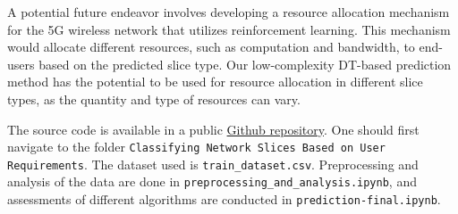 \documentclass[conference]{IEEEtran}
\begin{document}
A potential future endeavor involves developing a resource allocation mechanism for the 5G wireless network that utilizes reinforcement learning. This mechanism would allocate different resources, such as computation and bandwidth, to end-users based on the predicted slice type. Our low-complexity DT-based prediction method has the potential to be used for resource allocation in different slice types, as the quantity and type of resources can vary.

 
{}

\appendix
The source code is available in a public \href{https://github.com/sinaebrahimi/ml-7072cem}{Github repository}. One should first navigate to the folder \texttt{\footnotesize Classifying Network Slices Based on User Requirements}. The dataset used is \texttt{\footnotesize train\_dataset.csv}. Preprocessing and analysis of the data are done in \texttt{\footnotesize preprocessing\_and\_analysis.ipynb}, and assessments of different algorithms are conducted in \texttt{\footnotesize prediction-final.ipynb}.
\end{document}
